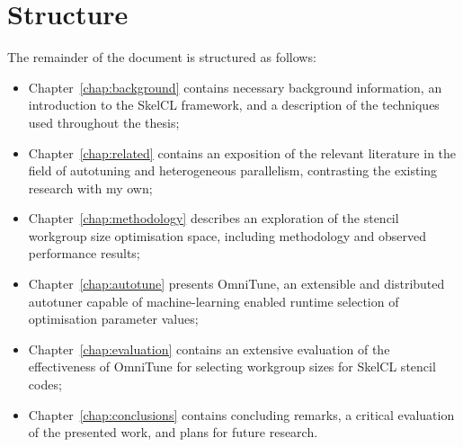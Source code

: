 \section{Structure}

The remainder of the document is structured as follows:

\begin{itemize}
\item Chapter~\ref{chap:background} contains necessary background
  information, an introduction to the SkelCL framework, and a
  description of the techniques used throughout the thesis;
\item Chapter~\ref{chap:related} contains an exposition of the
  relevant literature in the field of autotuning and heterogeneous
  parallelism, contrasting the existing research with my
  own;
\item Chapter~\ref{chap:methodology} describes an exploration of the
  stencil workgroup size optimisation space, including methodology and
  observed performance results;
\item Chapter~\ref{chap:autotune} presents OmniTune, an extensible and
  distributed autotuner capable of machine-learning enabled runtime
  selection of optimisation parameter values;
\item Chapter~\ref{chap:evaluation} contains an extensive evaluation
  of the effectiveness of OmniTune for selecting workgroup sizes for
  SkelCL stencil codes;
\item Chapter~\ref{chap:conclusions} contains concluding remarks, a
  critical evaluation of the presented work, and plans for future
  research.
\end{itemize}
